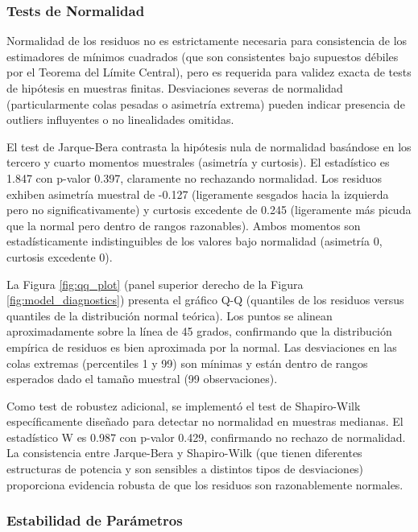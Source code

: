 \documentclass[3p,11pt,draft,natbib=false]{elsarticle}
\begin{document}
\subsubsection{Tests de Normalidad}

Normalidad de los residuos no es estrictamente necesaria para consistencia de los estimadores de mínimos cuadrados (que son consistentes bajo supuestos débiles por el Teorema del Límite Central), pero es requerida para validez exacta de tests de hipótesis en muestras finitas. Desviaciones severas de normalidad (particularmente colas pesadas o asimetría extrema) pueden indicar presencia de outliers influyentes o no linealidades omitidas.

El test de Jarque-Bera contrasta la hipótesis nula de normalidad basándose en los tercero y cuarto momentos muestrales (asimetría y curtosis). El estadístico es 1.847 con p-valor 0.397, claramente no rechazando normalidad. Los residuos exhiben asimetría muestral de -0.127 (ligeramente sesgados hacia la izquierda pero no significativamente) y curtosis excedente de 0.245 (ligeramente más picuda que la normal pero dentro de rangos razonables). Ambos momentos son estadísticamente indistinguibles de los valores bajo normalidad (asimetría 0, curtosis excedente 0).

La Figura \ref{fig:qq_plot} (panel superior derecho de la Figura \ref{fig:model_diagnostics}) presenta el gráfico Q-Q (quantiles de los residuos versus quantiles de la distribución normal teórica). Los puntos se alinean aproximadamente sobre la línea de 45 grados, confirmando que la distribución empírica de residuos es bien aproximada por la normal. Las desviaciones en las colas extremas (percentiles 1 y 99) son mínimas y están dentro de rangos esperados dado el tamaño muestral (99 observaciones).

Como test de robustez adicional, se implementó el test de Shapiro-Wilk específicamente diseñado para detectar no normalidad en muestras medianas. El estadístico W es 0.987 con p-valor 0.429, confirmando no rechazo de normalidad. La consistencia entre Jarque-Bera y Shapiro-Wilk (que tienen diferentes estructuras de potencia y son sensibles a distintos tipos de desviaciones) proporciona evidencia robusta de que los residuos son razonablemente normales.

\subsubsection{Estabilidad de Parámetros}
\end{document}
